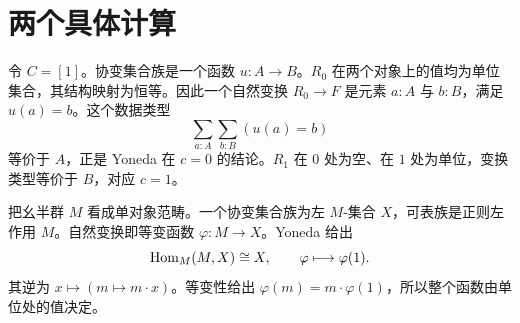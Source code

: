 \section{两个具体计算}
\begin{example}
令 $C=[1]$。协变集合族是一个函数 $u:A\to B$。$R_0$ 在两个对象上的值均为单位集合，其结构映射为恒等。因此一个自然变换 $R_0\to F$ 是元素 $a:A$ 与 $b:B$，满足 $u(a)=b$。这个数据类型
\[
\sum_{a:A}\sum_{b:B}(u(a)=b)
\]
等价于 $A$，正是 Yoneda 在 $c=0$ 的结论。$R_1$ 在 $0$ 处为空、在 $1$ 处为单位，变换类型等价于 $B$，对应 $c=1$。
\end{example}
\begin{example}[幺半群的正则作用]
把幺半群 $M$ 看成单对象范畴。一个协变集合族为左 $M$-集合 $X$，可表族是正则左作用 $M$。自然变换即等变函数 $\varphi:M\to X$。Yoneda 给出
\[
\operatorname{Hom}_M(M,X)\cong X,
\qquad \varphi\longmapsto\varphi(1).
\]
其逆为 $x\mapsto(m\mapsto m\cdot x)$。等变性给出 $\varphi(m)=m\cdot\varphi(1)$，所以整个函数由单位处的值决定。
\end{example}
